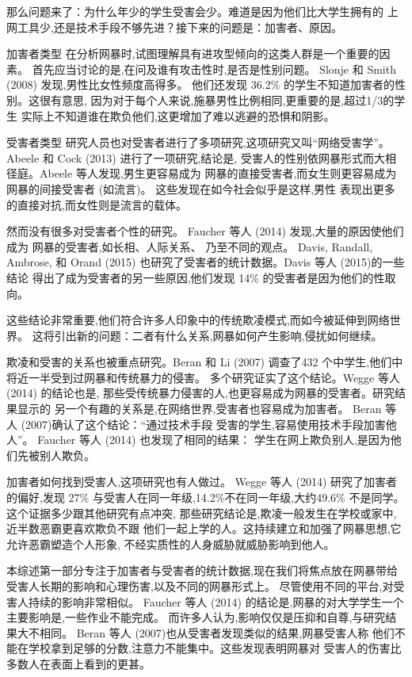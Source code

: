 \documentclass[a4paper]{article}
\begin{document}
那么问题来了：为什么年少的学生受害会少。难道是因为他们比大学生拥有的
上网工具少,还是技术手段不够先进？接下来的问题是：加害者、原因。

加害者类型
在分析网暴时,试图理解具有进攻型倾向的这类人群是一个重要的因素。
首先应当讨论的是,在问及谁有攻击性时,是否是性别问题。
Slonje 和 Smith (2008) \cite{slonje2008}发现,男性比女性频度高得多。
他们还发现 36.2\% 的学生不知道加害者的性别。这很有意思,
因为对于每个人来说,施暴男性比例相同,更重要的是,超过1/3的学生
实际上不知道谁在欺负他们,这更增加了难以逃避的恐惧和阴影。

受害者类型
研究人员也对受害者进行了多项研究,这项研究又叫``网络受害学''。
Abeele 和 Cock (2013)\cite{abeele2013} 进行了一项研究,结论是,
受害人的性别依网暴形式而大相径庭。Abeele 等人发现,男生更容易成为
网暴的直接受害者,而女生则更容易成为网暴的间接受害者 (如流言)。
这些发现在如今社会似乎是这样,男性
表现出更多的直接对抗,而女性则是流言的载体。

然而没有很多对受害者个性的研究。
Faucher 等人 (2014)\cite{faucher2014} 发现,大量的原因使他们成为
网暴的受害者,如长相、人际关系、 乃至不同的观点。
Davis, Randall, Ambrose, 和 Orand (2015)\cite{davis2015}
也研究了受害者的统计数据。Davis 等人 (2015)\cite{davis2015}的一些结论
得出了成为受害者的另一些原因,他们发现 14\% 的受害者是因为他们的性取向。

这些结论非常重要,他们符合许多人印象中的传统欺凌模式,而如今被延伸到网络世界。
这将引出新的问题：二者有什么关系,网暴如何产生影响,侵扰如何继续。

欺凌和受害的关系也被重点研究。Beran 和 Li (2007)\cite{beran2007}
调查了432 个中学生,他们中将近一半受到过网暴和传统暴力的侵害。
多个研究证实了这个结论。Wegge 等人 (2014)\cite{wegge2014} 的结论也是,
那些受传统暴力侵害的人,也更容易成为网暴的受害者。研究结果显示的
另一个有趣的关系是,在网络世界,受害者也容易成为加害者。
Beran 等人 (2007)\cite{beran2007}确认了这个结论：``通过技术手段
受害的学生,容易使用技术手段加害他人''。
Faucher 等人 (2014)\cite{faucher2014} 也发现了相同的结果：
学生在网上欺负别人,是因为他们先被别人欺负。

加害者如何找到受害人,这项研究也有人做过。
Wegge 等人 (2014)\cite{wegge2014} 研究了加害者的偏好,发现 27\%
与受害人在同一年级,14.2\%不在同一年级,大约49.6\% 不是同学。
这个证据多少跟其他研究有点冲突,
那些研究结论是,欺凌一般发生在学校或家中,近半数恶霸更喜欢欺负不跟
他们一起上学的人。这持续建立和加强了网暴思想,它允许恶霸塑造个人形象,
不经实质性的人身威胁就威胁影响到他人。

本综述第一部分专注于加害者与受害者的统计数据,现在我们将焦点放在网暴带给
受害人长期的影响和心理伤害,以及不同的网暴形式上。
尽管使用不同的平台,对受害人持续的影响非常相似。 Faucher 等人 (2014)
\cite{faucher2014}
的结论是,网暴的对大学学生一个主要影响是,一些作业不能完成。
而许多人认为,影响仅仅是压抑和自尊,与研究结果大不相同。
Beran 等人 (2007)\cite{beran2007}也从受害者发现类似的结果,网暴受害人称
他们不能在学校拿到足够的分数,注意力不能集中。这些发现表明网暴对
受害人的伤害比多数人在表面上看到的更甚。
\end{document}
